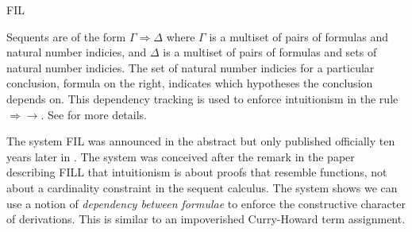 \begin{entry}{FIL}

\begin{clarifications}
Sequents are of the form $\Gamma \Rightarrow \Delta$ where $\Gamma$ is
a multiset of pairs of formulas and natural number indicies, and
$\Delta$ is a multiset of pairs of formulas and sets of natural number
indicies.  The set of natural number indicies for a particular
conclusion, formula on the right, indicates which hypotheses the
conclusion depends on.  This dependency tracking is used to enforce
intuitionism in the rule $\Rightarrow \to$.  See \cite{dePaiva:2005}
for more details.
\end{clarifications}

\begin{history}
The system FIL was announced in the abstract \cite{dePaiva:1995} but
only published officially ten years later in \cite{dePaiva:2005}.  The
system was conceived after the remark in the paper describing
FILL  that intuitionism is about proofs that resemble
functions, not about a cardinality constraint in the sequent
calculus. The system shows we can use a notion of {\em{dependency
between formulae}} to enforce the constructive character of
derivations. This is similar to an impoverished Curry-Howard term
assignment.
\end{history}


%
%
%
%
%
%
% 
%




\end{entry}
